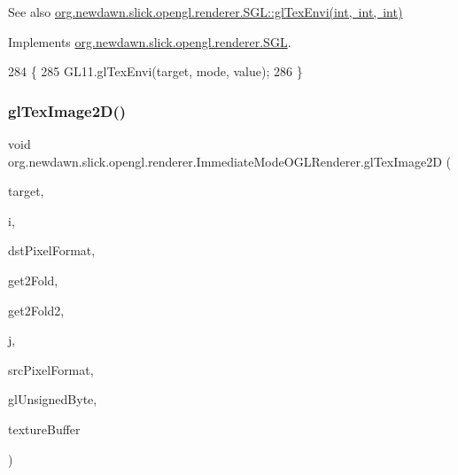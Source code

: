 \begin{DoxySeeAlso}{See also}
\mbox{\hyperlink{interfaceorg_1_1newdawn_1_1slick_1_1opengl_1_1renderer_1_1_s_g_l_a86e50032d7f9a3e8268fb20e5ce644ee}{org.\+newdawn.\+slick.\+opengl.\+renderer.\+S\+G\+L\+::gl\+Tex\+Envi(int, int, int)}} 
\end{DoxySeeAlso}


Implements \mbox{\hyperlink{interfaceorg_1_1newdawn_1_1slick_1_1opengl_1_1renderer_1_1_s_g_l_a86e50032d7f9a3e8268fb20e5ce644ee}{org.\+newdawn.\+slick.\+opengl.\+renderer.\+S\+GL}}.


\begin{DoxyCode}
284                                                            \{
285         GL11.glTexEnvi(target, mode, value);
286     \}
\end{DoxyCode}
\mbox{\label{classorg_1_1newdawn_1_1slick_1_1opengl_1_1renderer_1_1_immediate_mode_o_g_l_renderer_a3d04632d475991ab931c7176665ac9bf}} 
\subsubsection{\texorpdfstring{gl\+Tex\+Image2\+D()}{glTexImage2D()}}
{\footnotesize\ttfamily void org.\+newdawn.\+slick.\+opengl.\+renderer.\+Immediate\+Mode\+O\+G\+L\+Renderer.\+gl\+Tex\+Image2D (\begin{DoxyParamCaption}\item[{int}]{target,  }\item[{int}]{i,  }\item[{int}]{dst\+Pixel\+Format,  }\item[{int}]{get2\+Fold,  }\item[{int}]{get2\+Fold2,  }\item[{int}]{j,  }\item[{int}]{src\+Pixel\+Format,  }\item[{int}]{gl\+Unsigned\+Byte,  }\item[{Byte\+Buffer}]{texture\+Buffer }\end{DoxyParamCaption})\hspace{0.3cm}{\ttfamily [inline]}}

